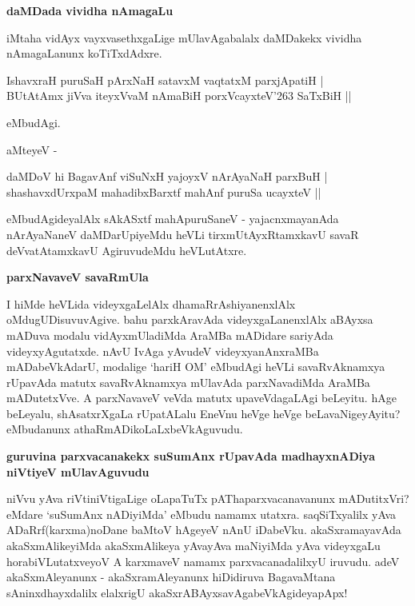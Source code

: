 {\bigskip
\noindent
{\large\bf daMDada vividha nAmagaLu}}\label{page100}
\medskip

\noindent
iMtaha vidAyx vayxvasethxgaLige mUlavAgabalalx daMDakekx vividha nAmagaLanunx koTiTxdAdxre.

\begin{shloka}
IshavxraH puruSaH pArxNaH satavxM vaqtatxM parxjApatiH |\\\label{100}
BUtAtAmx jiVva iteyxVvaM nAmaBiH porxVcayxteV\char'263 SaTxBiH ||
\end{shloka}

\noindent
eMbudAgi.

\newpage

\noindent
aMteyeV -

\begin{shloka}
daMDoV hi BagavAnf viSuNxH yajoyxV nArAyaNaH parxBuH |\\\label{100}
shashavxdUrxpaM mahadibxBarxtf mahAnf puruSa ucayxteV ||
\end{shloka}

\noindent
eMbudAgideyalAlx sAkASxtf mahApuruSaneV - yajacnxmayanAda nArAyaNaneV daMDa\-rUpi\-yeMdu heVLi tirxmUtAyxRtamxkavU savaR deVvatAtamxkavU AgiruvudeMdu heVLutAtxre.

{\bigskip
\noindent
{\large\bf parxNavaveV savaRmUla}}\label{page100}
\medskip

\noindent
I hiMde heVLida videyxgaLelAlx dhamaRrAshiyanenxlAlx oMdugUDisuvuvAgive. bahu parxkAravAda videyx\-gaLa\-nenxlAlx aBAyxsa mADuva modalu vidAyxmUladiMda AraMBa mADidare sariyAda videyxyAgu\-tatxde. nAvU IvAga yAvudeV videyxyanAnxraMBa mADabeVkAdarU, modalige `hariH OM' eMbudAgi heVLi savaRvAknamxya rUpavAda matutx savaRvAknamxya mUlavAda parxNavadiMda AraMBa mADutetxVve. A parxNavaveV veVda matutx upaveVdagaLAgi beLeyitu. hAge beLeyalu, shAsatxrXgaLa rUpatALalu EneVnu heVge heVge beLavaNigeyAyitu? eMbudanunx athaRmADikoLaLxbeVkAguvudu.

{\bigskip
\noindent
{\large\bf guruvina parxvacanakekx suSumAnx rUpavAda madhayxnADiya niVtiyeV mUlavAguvudu}}\label{page101}
\medskip

\noindent
niVvu yAva riVtiniVtigaLige oLapaTuTx pAThaparxvacanavanunx mADutitxVri? eMdare `suSumAnx nADi\-yiMda' eMbudu namamx utatxra. saqSiTxyalilx yAva ADaRrf(karxma)noDane baMtoV hAgeyeV nAnU iDa\-beVku. akaSxra\-mayavAda akaSxmAlikeyiMda akaSxmAlikeya yAvayAva maNiyiMda yAva videyxgaLu horabiVLu\-tatxveyoV A karxmaveV namamx parxvacanadalilxyU iruvudu. adeV akaSxmAleyanunx - akaSxra\-mAle\-yanunx hiDidiruva BagavaMtana sAninxdhayxdalilx elalxrigU akaSxrABAyxsavAgabeVkAgideyapApx!

